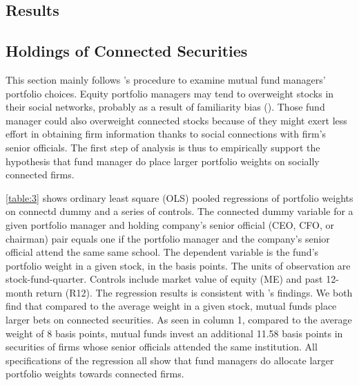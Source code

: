 \documentclass[11pt]{article}
\begin{document}
\begin{doublespace}
\section{Results}
\subsection{Holdings of Connected Securities}
This section mainly follows \cite{cohen2008small} 's procedure to examine mutual fund managers' portfolio choices. Equity portfolio managers may tend to overweight stocks in their social networks, probably as a result of familiarity bias (\cite{huberman2001familiarity}). Those fund manager could also overweight connected stocks because of they might exert less effort in obtaining firm information thanks to social connections with firm's senior officials. The first step of analysis is thus to empirically support the hypothesis that fund manager do place larger portfolio weights on socially connected firms. 

\ref{table:3} shows ordinary least square (OLS) pooled regressions of portfolio weights on connectd dummy and a series of controls. The connected dummy variable for a given portfolio manager and holding company's senior official (CEO, CFO, or chairman) pair equals one if the portfolio manager and the company's senior official attend the same same school. The dependent variable is the fund's portfolio weight in a given stock, in the basis points. The units of observation are stock-fund-quarter. Controls include market value of equity (ME) and past 12-month return (R12). The regression results is consistent with \cite{cohen2008small} 's findings. We both find that compared to the average weight in a given stock, mutual funds place larger bets on connected securities. As seen in column 1, compared to the average weight of 8 basis points, mutual funds invest an additional 11.58 basis points in securities of firms whose senior officials attended the same institution. All specifications of the regression all show that fund managers do allocate larger portfolio weights towards connected firms.


\end{doublespace}
\end{document}
